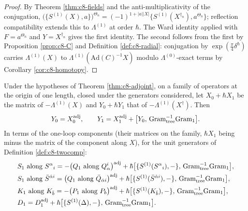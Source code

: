 \begin{proof}
By Theorem \ref{thm:c8-fields} and the anti-multiplicativity of the conjugation, $\big(\{S^{(1)}(X),a\}\big)^{\Theta_n}=(-1)^{1+|a||X|}\{S^{(1)}(X^{\dagger_n}),a^{\Theta_n}\}$; reflection compatibility extends this to $\Lambda^{(1)}$ at order $\hbar$. The Ward identity applied with $F=a^{\Theta_n}$ and $Y=X^{\dagger_n}$ gives the first identity. The second follows from the first by Proposition \ref{prop:c8-C} and Definition \ref{def:c8-radial}: conjugation by $\exp(\tfrac\pi4\delta^\hbar)$ carries $\Lambda^{(1)}(X)$ to $\Lambda^{(1)}(\mathrm{Ad}(C)^{-1}X)$ modulo $\Lambda^{(0)}$-exact terms by Corollary \ref{cor:c8-homotopy}.
\end{proof}

\begin{corollary}[The test $Q^\dagger=S$ in Gram form]
\label{cor:c8-gram}
Under the hypotheses of Theorem \ref{thm:c8-adjoint}, on a family of operators at the origin of one length, closed under the generators considered, let $X_0+\hbar X_1$ be the matrix of $-\Lambda^{(1)}(X)$ and $Y_0+\hbar Y_1$ that of $-\Lambda^{(1)}(X^\dagger)$. Then
\[
Y_0=X_0^{\rm adj},\qquad Y_1=X_1^{\rm adj}+\big[Y_0,\,\mathrm{Gram}_{\rm tree}^{-1}\mathrm{Gram}_{\rm 1}\big].
\]
In terms of the one-loop components (their matrices on the family, $\hbar X_1$ being minus the matrix of the component along $X$), for the unit generators of Definition \ref{def:c8-twocomp}:
\[
\begin{aligned}
&S_1\text{ along }S^\alpha{}_i=-\big(Q_1\text{ along }Q^i_\alpha\big)^{\rm adj}+\hbar\big[\{S^{(1)}(S^\alpha{}_i),-\},\,\mathrm{Gram}_{\rm tree}^{-1}\mathrm{Gram}_{\rm 1}\big],\\
&S_1\text{ along }\bar S^{\dot\alpha i}=\big(Q_1\text{ along }\bar Q_{\dot\alpha i}\big)^{\rm adj}+\hbar\big[\{S^{(1)}(\bar S^{\dot\alpha i}),-\},\,\mathrm{Gram}_{\rm tree}^{-1}\mathrm{Gram}_{\rm 1}\big],\\
&K_1\text{ along }K_{\bar b}=-\big(P_1\text{ along }P_b\big)^{\rm adj}+\hbar\big[\{S^{(1)}(K_{\bar b}),-\},\,\mathrm{Gram}_{\rm tree}^{-1}\mathrm{Gram}_{\rm 1}\big],\\
&D_1=D_1^{\rm adj}+\hbar\big[\{S^{(1)}(\Delta),-\},\,\mathrm{Gram}_{\rm tree}^{-1}\mathrm{Gram}_{\rm 1}\big].
\end{aligned}
\]

\end{corollary}
